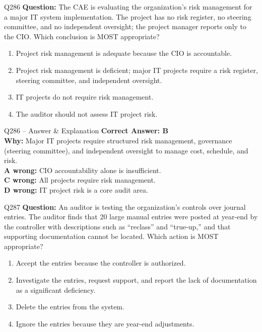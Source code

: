 \documentclass[aspectratio=169,10pt]{beamer}
\begin{document}
	\begin{frame}[t]{Q286}
		\small
		\textbf{Question:} The CAE is evaluating the organization's risk management for a major IT system implementation. The project has no risk register, no steering committee, and no independent oversight; the project manager reports only to the CIO. Which conclusion is MOST appropriate?
		\begin{enumerate}[label=\Alph*.,itemsep=1pt,topsep=2pt]
			\item Project risk management is adequate because the CIO is accountable.
			\item Project risk management is deficient; major IT projects require a risk register, steering committee, and independent oversight.
			\item IT projects do not require risk management.
			\item The auditor should not assess IT project risk.
		\end{enumerate}
	\end{frame}
	
	\begin{frame}[t]{Q286 -- Answer \& Explanation}
		\small
		\textbf{Correct Answer: B} \\[4pt]
		\textbf{Why:} Major IT projects require structured risk management, governance (steering committee), and independent oversight to manage cost, schedule, and risk. \\[4pt]
		\textbf{A wrong:} CIO accountability alone is insufficient. \\[2pt]
		\textbf{C wrong:} All projects require risk management. \\[2pt]
		\textbf{D wrong:} IT project risk is a core audit area.
	\end{frame}
	
	\begin{frame}[t]{Q287}
		\small
		\textbf{Question:} An auditor is testing the organization's controls over journal entries. The auditor finds that 20 large manual entries were posted at year-end by the controller with descriptions such as ``reclass'' and ``true-up,'' and that supporting documentation cannot be located. Which action is MOST appropriate?
		\begin{enumerate}[label=\Alph*.,itemsep=1pt,topsep=2pt]
			\item Accept the entries because the controller is authorized.
			\item Investigate the entries, request support, and report the lack of documentation as a significant deficiency.
			\item Delete the entries from the system.
			\item Ignore the entries because they are year-end adjustments.
		\end{enumerate}
	\end{frame}
	
\end{document}
